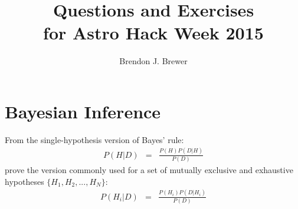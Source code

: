 \documentclass[a4paper, 11pt]{article}
\title{Questions and Exercises\\
for Astro Hack Week 2015}
\author{Brendon J. Brewer}
\begin{document}
\maketitle

\section{Bayesian Inference}

From the single-hypothesis version of Bayes' rule:
\begin{eqnarray}
P(H|D) &=& \frac{P(H)P(D|H)}{P(D)}
\end{eqnarray}
prove the version commonly used for a set of mutually exclusive and exhaustive
hypotheses $\{H_1, H_2, ..., H_N\}$:
\begin{eqnarray}
P(H_i|D) &=& \frac{P(H_i)P(D|H_i)}{P(D)}
\end{eqnarray}
\end{document}
